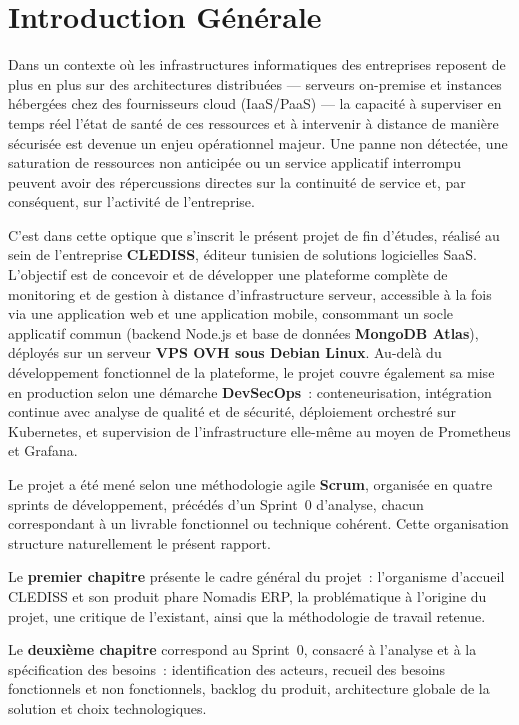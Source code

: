 \chapter*{Introduction Générale}

Dans un contexte où les infrastructures informatiques des entreprises reposent de plus en plus sur des architectures distribuées — serveurs on-premise et instances hébergées chez des fournisseurs cloud (IaaS/PaaS) — la capacité à superviser en temps réel l'état de santé de ces ressources et à intervenir à distance de manière sécurisée est devenue un enjeu opérationnel majeur. Une panne non détectée, une saturation de ressources non anticipée ou un service applicatif interrompu peuvent avoir des répercussions directes sur la continuité de service et, par conséquent, sur l'activité de l'entreprise.

C'est dans cette optique que s'inscrit le présent projet de fin d'études, réalisé au sein de l'entreprise \textbf{CLEDISS}, éditeur tunisien de solutions logicielles SaaS. L'objectif est de concevoir et de développer une plateforme complète de monitoring et de gestion à distance d'infrastructure serveur, accessible à la fois via une application web et une application mobile, consommant un socle applicatif commun (backend Node.js et base de données \textbf{MongoDB Atlas}), déployés sur un serveur \textbf{VPS OVH sous Debian Linux}. Au-delà du développement fonctionnel de la plateforme, le projet couvre également sa mise en production selon une démarche \textbf{DevSecOps}~: conteneurisation, intégration continue avec analyse de qualité et de sécurité, déploiement orchestré sur Kubernetes, et supervision de l'infrastructure elle-même au moyen de Prometheus et Grafana.

Le projet a été mené selon une méthodologie agile \textbf{Scrum}, organisée en quatre sprints de développement, précédés d'un Sprint~0 d'analyse, chacun correspondant à un livrable fonctionnel ou technique cohérent. Cette organisation structure naturellement le présent rapport.

Le \textbf{premier chapitre} présente le cadre général du projet~: l'organisme d'accueil CLEDISS et son produit phare Nomadis ERP, la problématique à l'origine du projet, une critique de l'existant, ainsi que la méthodologie de travail retenue.

Le \textbf{deuxième chapitre} correspond au Sprint~0, consacré à l'analyse et à la spécification des besoins~: identification des acteurs, recueil des besoins fonctionnels et non fonctionnels, backlog du produit, architecture globale de la solution et choix technologiques.

